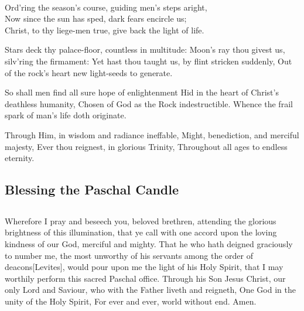\\
Ord’ring the season’s course, guiding men’s steps aright,\\
Now since the sun has sped, dark fears encircle us;\\
Christ, to thy liege-men true, give back the light of life.
\medskip

{\obeylines
Stars deck thy palace-floor, countless in multitude:
Moon’s ray thou givest us, silv’ring the firmament:
Yet hast thou taught us, by flint stricken suddenly,
Out of the rock’s heart new light-seeds to generate.

\medskip
So shall men find all sure hope of enlightenment
Hid in the heart of Christ’s deathless humanity,
Chosen of God as the Rock indestructible.
Whence the frail spark of man’s life doth originate.

\medskip
Through Him, in wisdom and radiance ineffable,
Might, benediction, and merciful majesty,
Ever thou reignest, in glorious Trinity,
Throughout all ages to endless eternity.
}


\subsection{Blessing the Paschal Candle}

\subsection{}

Wherefore I pray and beseech you, beloved brethren, attending the glorious brightness of this illumination, that ye call with one accord upon the loving kindness of our God, merciful and mighty.  That he who hath deigned graciously to number me, the most unworthy of his servants among the order of deacons[Levites], would pour upon me the light of his Holy Spirit, that I may worthily perform this sacred Paschal office.  Through his Son Jesus Christ, our only Lord and Saviour, who with the Father liveth and reigneth, One God in the unity of the Holy Spirit, For ever and ever, world without end. \R Amen.


